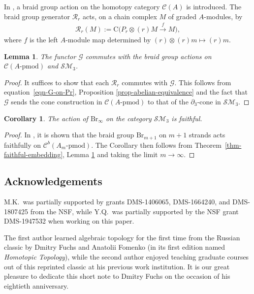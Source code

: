 \documentclass[10pt,a4paper]{amsart}
\newtheorem{cor}[thm]{Corollary}
\newtheorem{lem}[thm]{Lemma}
\theoremstyle{definition}
\numberwithin{equation}{section}
\renewcommand{\to}{\rightarrow}
\def\dif{\partial}
\def\lra{{\longrightarrow}}
\def\pmod{{\mathrm{\mbox{-}pmod}}} %
\def\mc{\mathcal}
\begin{document}
In \cite{KhSe}, a braid group action on the homotopy category $\mc{C}(A)$ is introduced. The braid group generator $\mc{R}_r$ acts, on a chain complex $M$ of graded $A$-modules, by
\begin{gather*}
 \mc{R}_r(M):= \mathrm{C}\Big(P_r\otimes (r)M \stackrel{f}{\lra} M \Big),
\end{gather*}
where $f$ is the left $A$-module map determined by $(r)\otimes (r)m \mapsto (r)m$.

\begin{lem}\label{lem-G-intertwines-braid-group-action}
The functor $\mc{G}$ commutes with the braid group actions on $\mc{C}(A\pmod)$ and $\mc{SM}_3$.
\end{lem}
\begin{proof}It suffices to show that each $\mc{R}_r$ commutes with $\mc{G}$. This follows from equation~\eqref{eqn-G-on-Pr}, Proposition \ref{prop-abelian-equivalence} and the fact that $\mc{G}$ sends the cone construction in $\mc{C}(A\pmod)$ to that of the $\dif_3$-cone in $\mc{SM}_3$.
\end{proof}


\begin{cor}The action of $\mathrm{Br}_\infty$ on the category $\mc{SM}_3$ is faithful.
\end{cor}

\begin{proof}In \cite[Corollary 1.2]{KhSe}, it is shown that the braid group $\mathrm{Br}_{m+1}$ on $m+1$ strands acts faithfully on $ \mc{C}^b(A_m\pmod) $. The Corollary then follows from Theorem~\ref{thm-faithful-embedding}, Lemma \ref{lem-G-intertwines-braid-group-action} and taking the limit $m\to \infty$.
\end{proof}


\subsection*{Acknowledgements}
M.K.\ was partially supported by grants DMS-1406065, DMS-1664240, and DMS-1807425 from the NSF, while Y.Q.\ was partially supported by the NSF grant DMS-1947532 when working on this paper.

The first author learned algebraic topology for the first time from the Russian classic by Dmitry Fuchs and Anatolii Fomenko \cite{FF} (in its first edition named \emph{Homotopic Topology}), while the second author enjoyed teaching graduate courses out of this reprinted classic at his previous work institution. It is our great pleasure to dedicate this short note to Dmitry Fuchs on the occasion of his eightieth anniversary.
\end{document}

